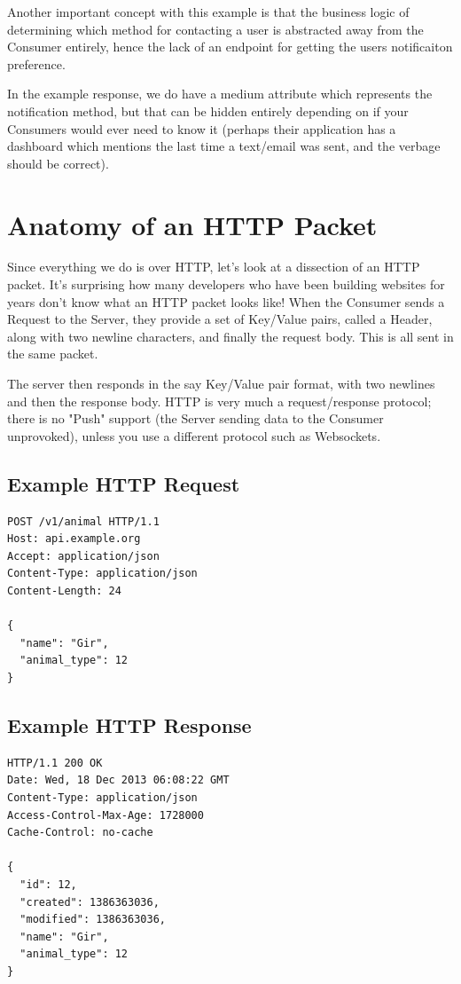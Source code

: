\documentclass{book}
\begin{document}
Another important concept with this example is that the business logic of determining which method for contacting a user is abstracted away from the Consumer entirely, hence the lack of an endpoint for getting the users notificaiton preference.

In the example response, we do have a medium attribute which represents the notification method, but that can be hidden entirely depending on if your Consumers would ever need to know it (perhaps their application has a dashboard which mentions the last time a text/email was sent, and the verbage should be correct).

\section{Anatomy of an HTTP Packet}

Since everything we do is over HTTP, let's look at a dissection of an HTTP packet. It's surprising how many developers who have been building websites for years don't know what an HTTP packet looks like! When the Consumer sends a Request to the Server, they provide a set of Key/Value pairs, called a Header, along with two newline characters, and finally the request body. This is all sent in the same packet.

The server then responds in the say Key/Value pair format, with two newlines and then the response body. HTTP is very much a request/response protocol; there is no "Push" support (the Server sending data to the Consumer unprovoked), unless you use a different protocol such as Websockets.

\subsection{Example HTTP Request}

\begin{verbatim}
POST /v1/animal HTTP/1.1
Host: api.example.org
Accept: application/json
Content-Type: application/json
Content-Length: 24

{
  "name": "Gir",
  "animal_type": 12
}
\end{verbatim}

\subsection{Example HTTP Response}

\begin{verbatim}
HTTP/1.1 200 OK
Date: Wed, 18 Dec 2013 06:08:22 GMT
Content-Type: application/json
Access-Control-Max-Age: 1728000
Cache-Control: no-cache

{
  "id": 12,
  "created": 1386363036,
  "modified": 1386363036,
  "name": "Gir",
  "animal_type": 12
}
\end{verbatim}
\end{document}

